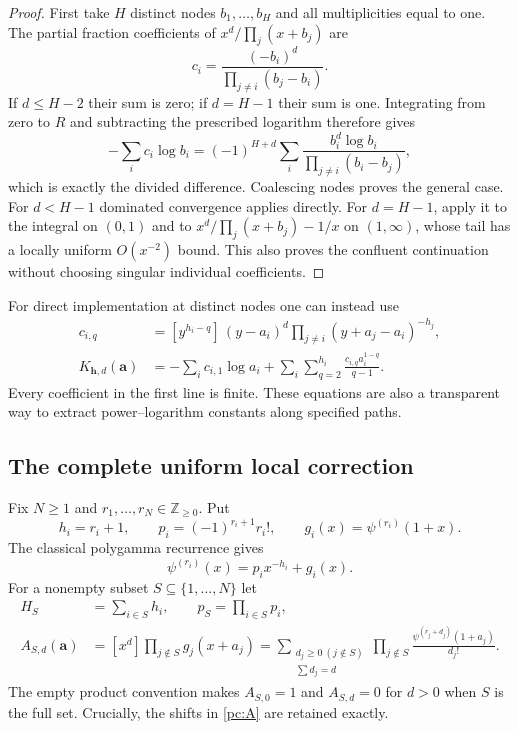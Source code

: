 \begin{proof}
First take $H$ distinct nodes $b_1,\ldots,b_H$ and all multiplicities
equal to one.  The partial fraction coefficients of
$x^d/\prod_j(x+b_j)$ are
\[
 c_i=\frac{(-b_i)^d}{\prod_{j\ne i}(b_j-b_i)}.
\]
If $d\le H-2$ their sum is zero; if $d=H-1$ their sum is one.
Integrating from zero to $R$ and subtracting the prescribed logarithm
therefore gives
\[
 -\sum_i c_i\log b_i
   =(-1)^{H+d}\sum_i
          \frac{b_i^d\log b_i}{\prod_{j\ne i}(b_i-b_j)},
\]
which is exactly the divided difference.  Coalescing nodes proves the
general case.  For $d<H-1$ dominated convergence applies directly.
For $d=H-1$, apply it to the integral on $(0,1)$ and to
$x^d/\prod_j(x+b_j)-1/x$ on $(1,\infty)$, whose tail has a
locally uniform $O(x^{-2})$ bound.  This also proves the confluent
continuation without choosing singular individual coefficients.
\end{proof}

For direct implementation at distinct nodes one can instead use
\begin{align}\label{pc:partial-fractions}
 c_{i,q}&=[y^{h_i-q}]\,(y-a_i)^d
                      \prod_{j\ne i}(y+a_j-a_i)^{-h_j},\\
 K_{\boldsymbol h,d}(\boldsymbol a)
   &=-\sum_i c_{i,1}\log a_i
       +\sum_i\sum_{q=2}^{h_i}
                    \frac{c_{i,q}a_i^{1-q}}{q-1}.
                    \label{pc:kernel-rational}
\end{align}
Every coefficient in the first line is finite.  These equations are
also a transparent way to extract power--logarithm constants along
specified paths.

\subsection{The complete uniform local correction}

Fix $N\ge1$ and $r_1,\ldots,r_N\in\mathbb Z_{\ge0}$.  Put
\[
 h_i=r_i+1,\qquad p_i=(-1)^{r_i+1}r_i!,\qquad
 g_i(x)=\psi^{(r_i)}(1+x).
\]
The classical polygamma recurrence \cite[Eq.~5.15.5]{DLMF} gives
\begin{equation}\label{pc:split}
 \psi^{(r_i)}(x)=p_i x^{-h_i}+g_i(x).
\end{equation}
For a nonempty subset $S\subseteq\{1,\ldots,N\}$ let
\begin{align}
 H_S&=\sum_{i\in S}h_i,\qquad p_S=\prod_{i\in S}p_i,\\
 A_{S,d}(\boldsymbol a)
   &=[x^d]\prod_{j\notin S}g_j(x+a_j)
     =\sum_{\substack{d_j\ge0\ (j\notin S)\\\sum d_j=d}}
          \prod_{j\notin S}
              \frac{\psi^{(r_j+d_j)}(1+a_j)}{d_j!}.
              \label{pc:A}
\end{align}
The empty product convention makes $A_{S,0}=1$ and $A_{S,d}=0$
for $d>0$ when $S$ is the full set.  Crucially, the shifts in
\eqref{pc:A} are retained exactly.

